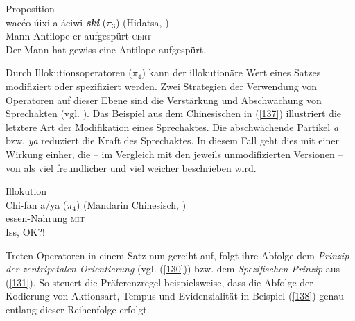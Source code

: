 \begin{exe}
	\ex\label{136}
	Proposition\\
	\gll wac\'{e}o \'{u}ixi        a   \'{a}ciwi         \textbf{\textit{ski}} ($\pi_{\textrm{3}}$) (Hidatsa, \citealt{Matthews1964})\\
	Mann Antilope er aufgespürt \textsc{cert}\\
	\glt Der Mann hat gewiss eine Antilope aufgespürt.	
\hfill\hbox {\citet[139]{Hengeveld1989}}	
\end{exe}
Durch Illokutionsoperatoren ($\pi_{\textrm{4}}$)  kann der illokutionäre Wert eines Satzes modifiziert oder spezifiziert werden. Zwei Strategien der Verwendung von Operatoren auf dieser Ebene sind die Verstärkung und Abschwächung von Sprechakten (vgl. \citealt[140-141]{Hengeveld1989}). Das Beispiel aus dem Chinesischen in (\ref{137}) illustriert die letztere Art der Modifikation eines Sprechaktes. Die abschwächende Partikel \textit{a} bzw. \textit{ya} reduziert die Kraft des Sprechaktes. In diesem Fall geht dies mit einer Wirkung einher, die – im Vergleich mit den jeweils unmodifizierten Versionen – von \citet[140]{Hengeveld1989} als \glqq viel freundlicher\grqq{} und \glqq viel weicher\grqq{} beschrieben wird. 

\begin{exe}
	\ex\label{137}
	Illokution\\
	\gll Chi-fan          a/ya ($\pi_{\textrm{4}}$) (Mandarin Chinesisch, \citealt{Li1981})\\
	essen-Nahrung \textsc{mit}\\
	\glt Iss, OK?!	
\hfill\hbox {\citet[140-141]{Hengeveld1989}}	
\end{exe}
Treten Operatoren in einem Satz nun gereiht auf, folgt ihre Abfolge dem \textit{Prinzip der zentripetalen Orientierung} (vgl. (\ref{130}))  bzw. dem \textit{Spezifischen Prinzip}  aus (\ref{131}). So steuert die Präferenzregel beispielsweise, dass die Abfolge der Kodierung von Aktionsart, Tempus und Evidenzialität in Beispiel (\ref{138}) genau entlang dieser Reihenfolge erfolgt.
	
